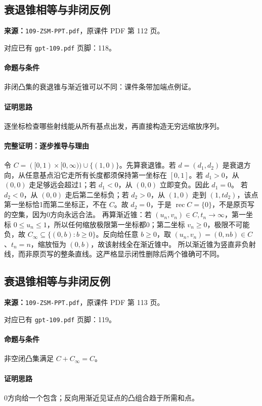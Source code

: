 \clearpage\subsection{衰退锥相等与非闭反例}
\textbf{来源：}\texttt{109-ZSM-PPT.pdf}，原课件 PDF 第 112 页。\par
对应已有 \texttt{gpt-109.pdf} 页脚：118。\par
\paragraph{命题与条件}非闭凸集的衰退锥与渐近锥可以不同：课件条带加端点例证。
\paragraph{证明思路}逐坐标检查哪些射线能从所有基点出发，再直接构造无穷远缩放序列。
\paragraph{完整证明：逐步推导与理由}

令 $C=([0,1)\times[0,\infty))\cup\{(1,0)\}$。先算衰退锥。若 $d=(d_1,d_2)$ 是衰退方向，从任意基点沿它走所有长度都须保持第一坐标在 $[0,1]$。若 $d_1>0$，从 $(0,0)$ 走足够远会超过1；若 $d_1<0$，从 $(0,0)$ 立即变负。因此 $d_1=0$。
若 $d_2<0$，从 $(0,0)$ 走后第二坐标负；若 $d_2>0$，从 $(1,0)$ 走到 $(1,td_2)$，该点第一坐标恰1而第二坐标正，不在 $C$。故 $d_2=0$，于是 $\operatorname{rec}C=\{0\}$，不是原页写的空集，因为0方向永远合法。
再算渐近锥：若 $(u_n,v_n)\in C,t_n\to\infty$，第一坐标 $0\le u_n\le1$，所以任何缩放极限第一坐标都0；第二坐标 $v_n\ge0$，极限不可能负，故 $C_\infty\subseteq\{(0,b):b\ge0\}$。反向给任意 $b\ge0$，取 $(u_n,v_n)=(0,nb)\in C$、$t_n=n$，缩放恒为 $(0,b)$，故该射线全在渐近锥中。
所以渐近锥为竖直非负射线，而非原页写的整条直线。这严格显示闭性删除后两个锥确可不同。

\clearpage\subsection{衰退锥相等与非闭反例}
\textbf{来源：}\texttt{109-ZSM-PPT.pdf}，原课件 PDF 第 113 页。\par
对应已有 \texttt{gpt-109.pdf} 页脚：119。\par
\paragraph{命题与条件}非空闭凸集满足 $C+C_\infty=C$。
\paragraph{证明思路}0方向给一个包含；反向用渐近见证点的凸组合趋于所需和点。
